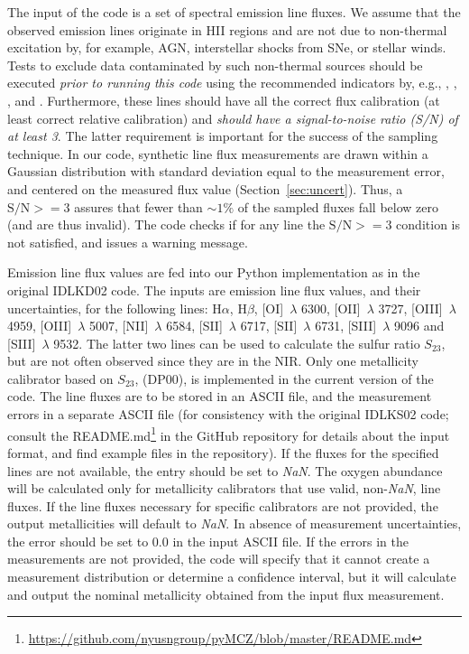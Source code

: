 \documentclass{emulateapj} \usepackage{amsmath} \usepackage{float}
\newcommand{\ha}{\ensuremath{\mathrm{H}\alpha}}
\newcommand{\hb}{\ensuremath{\mathrm{H}\beta}}
\begin{document}
The input of the code is a set of spectral emission line fluxes. We
assume that the observed emission lines originate in HII regions and
are not due to non-thermal excitation by, for example, AGN,
interstellar shocks from SNe, or stellar winds.  Tests to exclude data
contaminated by such non-thermal sources should be executed
\emph{prior to running this code} using the recommended indicators by,
e.g., \citet{baldwin81}, \citet{kauffmann03}, \citet{kewley06_sdss},
and \citet{cidfernandes10,sanchez15}. Furthermore, these lines should
have all the correct flux calibration (at least correct relative
calibration) and \emph{should have a signal-to-noise ratio (S/N) of at
 least 3}. 
%
The latter requirement is important for the success of the sampling
technique. In our code, synthetic line flux measurements are drawn
within a Gaussian distribution with standard deviation equal to the
measurement error, and centered on the measured flux value
(Section~\ref{sec:uncert}). Thus, a $\mathrm{S/N} >= 3$ assures that
fewer than $\sim1\%$ of the sampled fluxes fall below zero (and are
thus invalid).  The code checks if for any line the $\mathrm{S/N} >=
3$ condition is not satisfied, and issues a warning message.

Emission line flux values are fed into our Python implementation as in
the original IDLKD02 code. The inputs are emission line flux values,
and their uncertainties, for the following lines: \ha, \hb,
[OI]~$\lambda$ 6300, [OII]~$\lambda$ 3727, [OIII]~$\lambda$ 4959,
[OIII]~$\lambda$ 5007, [NII]~$\lambda$ 6584, [SII]~$\lambda$ 6717,
[SII]~$\lambda$ 6731,  [SIII]~$\lambda$ 9096 and [SIII]~$\lambda$ 9532. The latter two lines
can be used to calculate the sulfur ratio
%
$S_{23}$, 
%
but are not often observed since they are in the NIR. Only one metallicity calibrator based on
$S_{23}$, 
\citealt{diaz00} (DP00), is implemented in the current version of the code. 
The line fluxes are to be stored in an ASCII file,
and the measurement errors in a separate ASCII file (for consistency with the original IDLKS02 code; consult the
README.md\footnote{\url{https://github.com/nyusngroup/pyMCZ/blob/master/README.md}}
in the GitHub repository for details about the input format, and find
example files in the repository).  If the fluxes for the specified
lines are not available, the entry should be set to \emph{NaN}. The
oxygen abundance will be calculated only for metallicity calibrators
that use valid, non-\emph{NaN}, line fluxes.  If the line fluxes
necessary for specific calibrators are not provided, the output
metallicities will default to \emph{NaN}. In absence of measurement
uncertainties, the error should be set to 0.0 in the input ASCII
file. If the errors in the measurements are not provided, the code
will specify that it cannot create a measurement distribution or
determine a confidence interval, but it will calculate and output the
nominal metallicity obtained from the input flux measurement.
\end{document}
